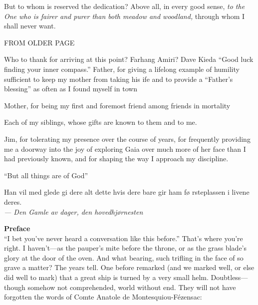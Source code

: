 But to whom is reserved the dedication? Above all, in every good
sense, \emph{to the One who is fairer and purer than both meadow and
  woodland,} through whom I shall never want.

FROM OLDER PAGE

Who to thank for arriving at this point?
Farhang Amiri?
Dave Kieda ``Good luck finding your inner compass.''
Father, for giving a lifelong example of humility sufficient to keep my mother from taking his ife and to provide a ``Father's blessing'' as often as I found myself in town

Mother, for being my first and foremost friend among friends in mortality

Each of my siblings, whose gifts are known to them and to me.

Jim, for tolerating my presence over the course of years, for frequently providing me a doorway into the joy of exploring Gaia over much more of her face than I had previously known, and for shaping the way I approach my discipline.

``But all things are of God''


\newpage

\begin{flushright}
\begin{minipage}[]{0.55\linewidth}
    \begin{flushright}
      Han vil med glede gi dere alt dette hvis dere bare gir ham f\o
      rsteplassen i livene deres.  \\{\small \emph{--- Den Gamle av
          dager, den hovedhj\o rnesten} }
    \end{flushright}
\end{minipage}
\end{flushright}

{\Huge \bf Preface} \\

``I bet you've never heard a conversation like this before.'' That's
where you're right. I haven't---as the pauper's mite before the
throne, or as the grass blade's glory at the door of the
oven. And what bearing, such trifling in the face of so grave a
matter?  The years tell.  One before remarked (and we marked well, or
else did well to mark) that a great ship is turned by a very small
helm. Doubtless---though somehow not comprehended, world without
end. They will not have forgotten the words of Comte Anatole de
Montesquiou-F\'{e}zensac:

